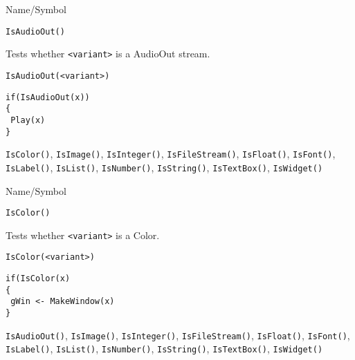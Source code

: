 \begin{desc}{Name/Symbol}
\item[Name/Symbol]	\verb+IsAudioOut()+

\item[Description]	Tests whether \verb+<variant>+ is a AudioOut stream.

\item[Usage]
\begin{verbatim}
IsAudioOut(<variant>)
\end{verbatim}

\item[Example]
\begin{verbatim}
if(IsAudioOut(x))
{
 Play(x)
}
\end{verbatim}

\item[See Also] \verb+IsColor()+, \verb+IsImage()+,
  \verb+IsInteger()+, \verb+IsFileStream()+, \verb+IsFloat()+,
  \verb+IsFont()+, \verb+IsLabel()+, \verb+IsList()+,
  \verb+IsNumber()+, \verb+IsString()+, \verb+IsTextBox()+,
  \verb+IsWidget()+
\end{desc}

\rl


\begin{desc}{Name/Symbol}
\item[Name/Symbol]	\verb+IsColor()+

\item[Description]	Tests whether \verb+<variant>+ is a Color.

\item[Usage]
\begin{verbatim}
IsColor(<variant>)
\end{verbatim}

\item[Example]
\begin{verbatim}
if(IsColor(x)
{
 gWin <- MakeWindow(x)
}
\end{verbatim}

\item[See Also] \verb+IsAudioOut()+, \verb+IsImage()+,
  \verb+IsInteger()+, \verb+IsFileStream()+, \verb+IsFloat()+,
  \verb+IsFont()+, \verb+IsLabel()+, \verb+IsList()+,
  \verb+IsNumber()+, \verb+IsString()+, \verb+IsTextBox()+,
  \verb+IsWidget()+
\end{desc}

\rl




